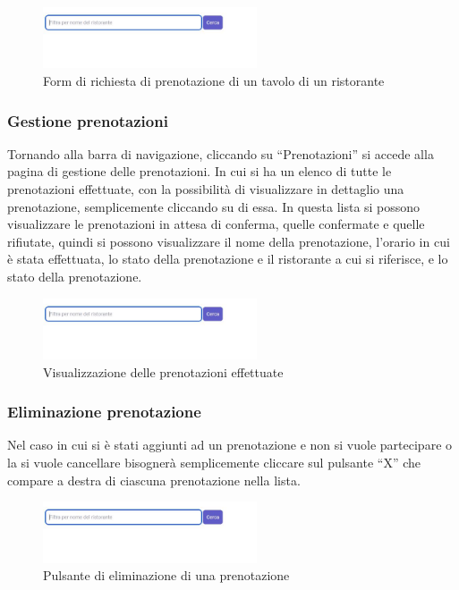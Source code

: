 \begin{figure}[htbp]
	\centering
	\includegraphics[width=0.5625\textwidth]{./img/Dettaglio.jpg}
	\caption{Form di richiesta di prenotazione di un tavolo di un ristorante}
\end{figure}

\subsubsection{Gestione prenotazioni}
Tornando alla barra di navigazione, cliccando su ``Prenotazioni'' si accede alla pagina di gestione delle prenotazioni.
In cui si ha un elenco di tutte le prenotazioni effettuate, con la possibilità di visualizzare in dettaglio una prenotazione, semplicemente cliccando su di essa.
In questa lista si possono visualizzare le prenotazioni in attesa di conferma, quelle confermate e quelle rifiutate, quindi si possono visualizzare il nome della 
prenotazione, l'orario in cui è stata effettuata, lo stato della prenotazione e il ristorante a cui si riferisce, e lo stato della prenotazione.

\begin{figure}[htbp]
	\centering
	\includegraphics[width=0.5625\textwidth]{./img/Dettaglio.jpg}
	\caption{Visualizzazione delle prenotazioni effettuate}
\end{figure}

\subsubsection{Eliminazione prenotazione}
Nel caso in cui si è stati aggiunti ad un prenotazione e non si vuole partecipare o la si vuole cancellare bisognerà semplicemente cliccare sul pulsante ``X'' 
che compare a destra di ciascuna prenotazione nella lista.

\begin{figure}[htbp]
	\centering
	\includegraphics[width=0.5625\textwidth]{./img/Dettaglio.jpg}
	\caption{Pulsante di eliminazione di una prenotazione}
\end{figure}

